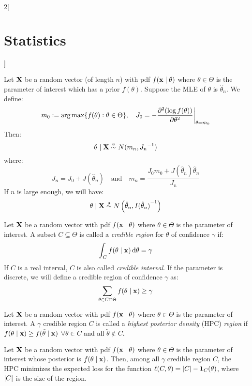\documentclass[../../../main_math.tex]{subfiles}
\begin{document}
\begin{multicols}{2}[\section{Statistics}]
  \begin{theorem}
    Let $\boldsymbol{\mathrm{X}}$ be a random vector (of length $n$) with pdf $f(\boldsymbol{\mathrm{x}}\mid \theta)$ where $\theta\in\Theta$ is the parameter of interest which has a prior $f(\theta)$. Suppose the MLE of $\theta$ is $\hat\theta_n$. We define: $$m_0:=\operatorname*{arg\,max}\{f(\theta):\theta\in\Theta\},\quad J_0=-\pdv[2]{(\log f(\theta))}{\theta}\bigg|_{\theta=m_0}$$ Then: $$\theta\mid\boldsymbol{\mathrm{X}}\overset{\text{a}}{\sim} N(m_n,{J_n}^{-1})$$
    where: $$J_n=J_0+J(\hat\theta_n)\quad\text{and}\quad m_n=\frac{J_0m_0+J(\hat\theta_n)\hat\theta_n}{J_n}$$
    If $n$ is large enough, we will have: $$\theta\mid\boldsymbol{\mathrm{X}}\overset{\text{a}}{\sim} N\left(\hat\theta_n,{I(\hat\theta_n)}^{-1}\right)$$
  \end{theorem}
  \begin{definition}
    Let $\boldsymbol{\mathrm{X}}$ be a random vector with pdf $f(\boldsymbol{\mathrm{x}}\mid \theta)$ where $\theta\in\Theta$ is the parameter of interest. A subset $C\subseteq \Theta$ is called a \emph{credible region} for $\theta$ of confidence $\gamma$ if: $$\int_Cf(\theta\mid\boldsymbol{\mathrm{x}})\dd{\theta}=\gamma$$ If $C$ is a real interval, $C$ is also called \emph{credible interval}. If the parameter is discrete, we will define a credible region of confidence $\gamma$ as: $$\sum_{\theta\in C\cap \Theta}f(\theta\mid\boldsymbol{\mathrm{x}})\geq \gamma$$
  \end{definition}
  \begin{definition}
    Let $\boldsymbol{\mathrm{X}}$ be a random vector with pdf $f(\boldsymbol{\mathrm{x}}\mid \theta)$ where $\theta\in\Theta$ is the parameter of interest. A $\gamma$ credible region $C$ is called a \emph{highest posterior density} (HPC) \emph{region} if $f(\theta\mid\boldsymbol{\mathrm{x}})\geq f(\tilde{\theta}\mid \boldsymbol{\mathrm{x}})$ $\forall \theta\in C$ and all $\tilde{\theta}\notin C$.
  \end{definition}
  \begin{proposition}
    Let $\boldsymbol{\mathrm{X}}$ be a random vector with pdf $f(\boldsymbol{\mathrm{x}}\mid \theta)$ where $\theta\in\Theta$ is the parameter of interest whose posterior is $f(\theta\mid\boldsymbol{\mathrm{x}})$. Then, among all $\gamma$ credible region $C$, the HPC minimizes the expected loss for the function $\ell(C,\theta)=\abs{C}-\boldsymbol{\mathrm{1}}_{C}(\theta)$, where $\abs{C}$ is the size of the region.
  \end{proposition}


\end{multicols}
\end{document}

